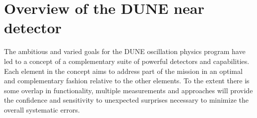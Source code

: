 






\section{Overview of the DUNE near detector}
\label{sec:exsum-nd-overview}
%

The ambitious and varied goals for the DUNE oscillation physics program have led to a concept of a complementary suite of powerful detectors and capabilities.  Each element in the concept aims to address part of the mission in an optimal and complementary fashion relative to the other elements.  To the extent there is some overlap in functionality, multiple measurements and approaches will provide the confidence and sensitivity to unexpected surprises necessary to minimize the overall systematic errors. 


